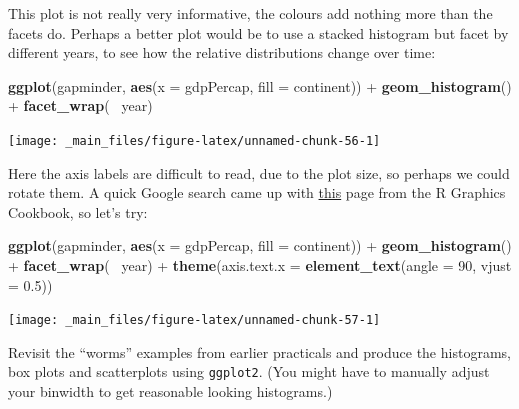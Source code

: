 \documentclass[]{book}
\newenvironment{Shaded}{\begin{snugshade}}{\end{snugshade}}
\newcommand{\KeywordTok}[1]{\textcolor[rgb]{0.13,0.29,0.53}{\textbf{{#1}}}}
\newcommand{\DataTypeTok}[1]{\textcolor[rgb]{0.13,0.29,0.53}{{#1}}}
\newcommand{\DecValTok}[1]{\textcolor[rgb]{0.00,0.00,0.81}{{#1}}}
\newcommand{\FloatTok}[1]{\textcolor[rgb]{0.00,0.00,0.81}{{#1}}}
\newcommand{\StringTok}[1]{\textcolor[rgb]{0.31,0.60,0.02}{{#1}}}
\newcommand{\NormalTok}[1]{{#1}}
\newcommand{\bblockT}[1]{\begin{tcolorbox}[title = Task #1]}
\newcommand{\eblockT}{\end{tcolorbox}}
\theoremstyle{definition}
\theoremstyle{definition}
\theoremstyle{definition}
\theoremstyle{remark}
\begin{document}
This plot is not really very informative, the colours add nothing more
than the facets do. Perhaps a better plot would be to use a stacked
histogram but facet by different years, to see how the relative
distributions change over time:

\begin{Shaded}
\begin{Highlighting}[]
\KeywordTok{ggplot}\NormalTok{(gapminder,}
       \KeywordTok{aes}\NormalTok{(}\DataTypeTok{x =} \NormalTok{gdpPercap, }\DataTypeTok{fill =} \NormalTok{continent)) +}
\StringTok{    }\KeywordTok{geom_histogram}\NormalTok{() +}
\StringTok{    }\KeywordTok{facet_wrap}\NormalTok{(~}\StringTok{ }\NormalTok{year)}
\end{Highlighting}
\end{Shaded}

\begin{center}\texttt{[image: \_main\_files/figure-latex/unnamed-chunk-56-1]} \end{center}

Here the axis labels are difficult to read, due to the plot size, so
perhaps we could rotate them. A quick Google search came up with
\href{http://www.cookbook-r.com/Graphs/Axes_(ggplot2)/}{this} page from
the R Graphics Cookbook, so let's try:

\begin{Shaded}
\begin{Highlighting}[]
\KeywordTok{ggplot}\NormalTok{(gapminder,}
       \KeywordTok{aes}\NormalTok{(}\DataTypeTok{x =} \NormalTok{gdpPercap, }\DataTypeTok{fill =} \NormalTok{continent)) +}
\StringTok{    }\KeywordTok{geom_histogram}\NormalTok{() +}
\StringTok{    }\KeywordTok{facet_wrap}\NormalTok{(~}\StringTok{ }\NormalTok{year) +}
\StringTok{    }\KeywordTok{theme}\NormalTok{(}\DataTypeTok{axis.text.x =} \KeywordTok{element_text}\NormalTok{(}\DataTypeTok{angle =} \DecValTok{90}\NormalTok{, }\DataTypeTok{vjust =} \FloatTok{0.5}\NormalTok{))}
\end{Highlighting}
\end{Shaded}

\begin{center}\texttt{[image: \_main\_files/figure-latex/unnamed-chunk-57-1]} \end{center}

\hypertarget{tsk6}{}\bblockT{6}

Revisit the ``worms'' examples from earlier practicals and produce the
histograms, box plots and scatterplots using \texttt{ggplot2}. (You
might have to manually adjust your binwidth to get reasonable looking
histograms.) \eblockT
\end{document}
